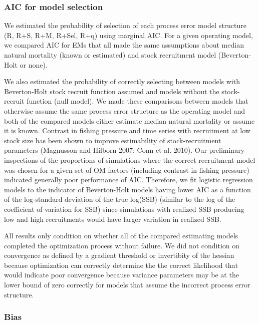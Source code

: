 \documentclass[
  12pt,
]{article}
\begin{document}
\hypertarget{aic-for-model-selection}{%
\subsubsection*{AIC for model selection}\label{aic-for-model-selection}}

We estimated the probability of selection of each process error model
structure (R, R+S, R+M, R+Sel, R+q) using marginal AIC. For a given
operating model, we compared AIC for EMs that all made the same
assumptions about median natural mortality (known or estimated) and
stock recruitment model (Beverton-Holt or none).

We also estimated the probability of correctly selecting between models
with Beverton-Holt stock recruit function assumed and models without the
stock-recruit function (null model). We made these comparisons between
models that otherwise assume the same process error structure as the
operating model and both of the compared models either estimate median
natural mortality or assume it is known. Contrast in fishing pressure
and time series with recruitment at low stock size has been shown to
improve estimability of stock-recruitment parameters (Magnusson and
Hilborn 2007; Conn et al. 2010). Our preliminary inspections of the
proportions of simulations where the correct recruitment model was
chosen for a given set of OM factors (including contrast in fishing
pressure) indicated generally poor performance of AIC. Therefore, we fit
logistic regression models to the indicator of Beverton-Holt models
having lower AIC as a function of the log-standard deviation of the true
log(SSB) (similar to the log of the coefficient of variation for SSB)
since simulations with realized SSB producing low and high recruitments
would have larger variation in realized SSB.

All results only condition on whether all of the compared estimating
models completed the optimization process without failure. We did not
condition on convergence as defined by a gradient threshold or
invertibity of the hessian because optimization can correctly determine
the the correct likelihood that would indicate poor convergence because
variance parameters may be at the lower bound of zero correctly for
models that assume the incorrect process error structure.

\hypertarget{bias}{%
\subsubsection*{Bias}\label{bias}}
\end{document}
